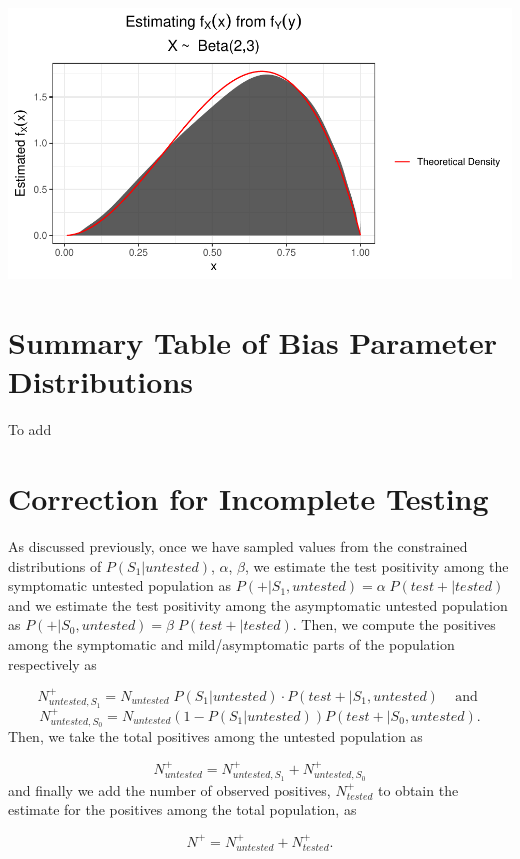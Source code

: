 \documentclass[12pt,twoside]{smiththesis}
\begin{document}
\includegraphics[width=0.8\linewidth]{thesis_files/figure-latex/unnamed-chunk-41-1}

\hypertarget{summary-table-of-bias-parameter-distributions}{%
\section{Summary Table of Bias Parameter Distributions}\label{summary-table-of-bias-parameter-distributions}}

To add

\hypertarget{correction-for-incomplete-testing}{%
\section{Correction for Incomplete Testing}\label{correction-for-incomplete-testing}}

As discussed previously, once we have sampled values from the constrained distributions of \(P(S_1|untested)\), \(\alpha\), \(\beta\), we estimate the test positivity among the symptomatic untested population as \(P(+|S_1,untested) = \alpha \; P(test +|tested)\) and we estimate the test positivity among the asymptomatic untested population as \(P(+|S_0,untested) = \beta \; P(test +|tested)\). Then, we compute the positives among the symptomatic and mild/asymptomatic parts of the population respectively as

\[N^+_{untested,S_1} = N_{untested} \; P(S_1|untested) \cdot P(test + | S_1,untested) \;\;\;\text{ and }\]
\[N^+_{untested,S_0} = N_{untested}(1-P(S_1|untested))P(test + | S_0,untested).\]
Then, we take the total positives among the untested population as

\[N^+_{untested} = N^+_{untested,S_1} + N^+_{untested,S_0}\]
and finally we add the number of observed positives, \(N^+_{tested}\) to obtain the estimate for the positives among the total population, as

\[N^+ = N^+_{untested} +N^+_{tested}.\]
\end{document}
